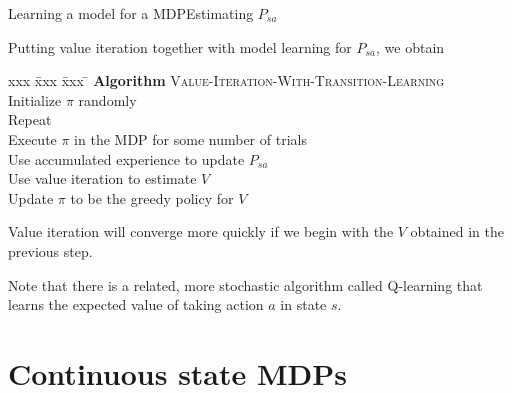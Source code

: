 \documentclass{beamer}
\begin{document}
\begin{frame}{Learning a model for a MDP}{Estimating $P_{sa}$}

  Putting value iteration together with model learning for $P_{sa}$, we obtain
  \begin{tabbing}
    xxx \= xxx \= xxx \= \kill
    \textbf{Algorithm} \textsc{Value-Iteration-With-Transition-Learning} \\
    \> Initialize $\pi$ randomly \\
    \> Repeat \\
    \> \> Execute $\pi$ in the MDP for some number of trials \\
    \> \> Use accumulated experience to update $P_{sa}$ \\
    \> \> Use value iteration to estimate $V$ \\
    \> \> Update $\pi$ to be the greedy policy for $V$ \\
  \end{tabbing}

  \medskip

  Value iteration will converge more quickly if we begin with the $V$
  obtained in the previous step.

  \medskip

  Note that there is a related, more stochastic algorithm called
  \alert{Q-learning} that learns the expected value of taking action
  $a$ in state $s$.
  
\end{frame}

\section{Continuous state MDPs}
\end{document}
